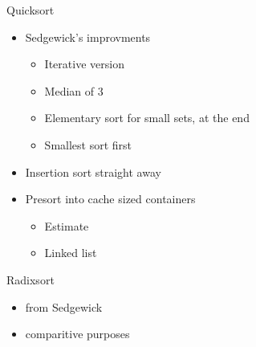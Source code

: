 \begin{slide}

\begin{stitle}
Quicksort
\end{stitle}

\begin{itemize}
\item Sedgewick's improvments
\begin{itemize}
\item Iterative version
\item Median of 3
\item Elementary sort for small sets, at the end
\item Smallest sort first
\end{itemize}
\item Insertion sort straight away
\item Presort into cache sized containers
\begin{itemize}
\item Estimate
\item Linked list
\end{itemize}
\end{itemize}
\end{slide}

\begin{slide}
\begin{stitle}
Radixsort
\end{stitle}

\begin{itemize}
\item from Sedgewick
\item comparitive purposes
\end{itemize}
\end{slide}

